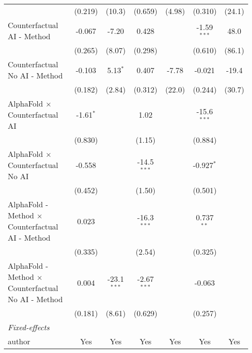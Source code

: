\begin{tabular}{lcccccc}
                                                              & (0.219)      & (10.3)        & (0.659)       & (4.98)        & (0.310)       & (24.1)\\   
   Counterfactual AI - Method                                 & -0.067       & -7.20         & 0.428         &               & -1.59$^{***}$ & 48.0\\   
                                                              & (0.265)      & (8.07)        & (0.298)       &               & (0.610)       & (86.1)\\   
   Counterfactual No AI - Method                              & -0.103       & 5.13$^{*}$    & 0.407         & -7.78         & -0.021        & -19.4\\   
                                                              & (0.182)      & (2.84)        & (0.312)       & (22.0)        & (0.244)       & (30.7)\\   
   AlphaFold $\times$ Counterfactual AI                       & -1.61$^{*}$  &               & 1.02          &               & -15.6$^{***}$ &   \\   
                                                              & (0.830)      &               & (1.15)        &               & (0.884)       &   \\   
   AlphaFold $\times$ Counterfactual No AI                    & -0.558       &               & -14.5$^{***}$ &               & -0.927$^{*}$  &   \\   
                                                              & (0.452)      &               & (1.50)        &               & (0.501)       &   \\   
   AlphaFold - Method $\times$ Counterfactual AI - Method     & 0.023        &               & -16.3$^{***}$ &               & 0.737$^{**}$  &   \\   
                                                              & (0.335)      &               & (2.54)        &               & (0.325)       &   \\   
   AlphaFold - Method $\times$ Counterfactual No AI - Method  & 0.004        & -23.1$^{***}$ & -2.67$^{***}$ &               & -0.063        &   \\   
                                                              & (0.181)      & (8.61)        & (0.629)       &               & (0.257)       &   \\   
   \midrule
   \emph{Fixed-effects}\\
   author                                                     & Yes          & Yes           & Yes           & Yes           & Yes           & Yes\\  

\end{tabular}
